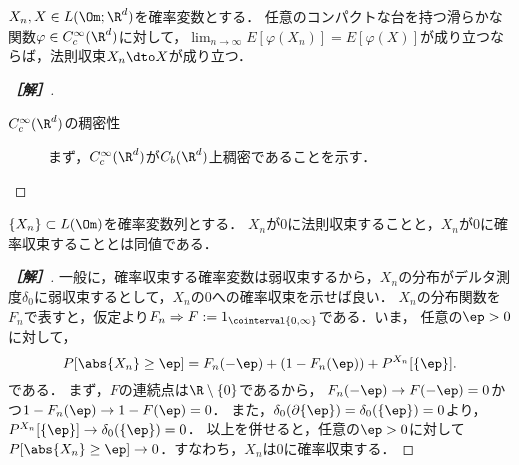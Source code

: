 \documentclass[uplatex,dvipdfmx]{jsarticle}
\begin{document}
\begin{problem*}[21]
    $X_n,X\in L(\Om;\R^d)$を確率変数とする．
    任意のコンパクトな台を持つ滑らかな関数$\varphi\in C_c^\infty(\R^d)$に対して，$\lim_{n\to\infty}E[\varphi(X_n)]=E[\varphi(X)]$が成り立つならば，法則収束$X_n\dto X$が成り立つ．
\end{problem*}
\begin{proof}[\bf［解］]\mbox{}
    \begin{description}
        \item[$C_c^\infty(\R^d)$の稠密性] まず，$C_c^\infty(\R^d)$が$C_b(\R^d)$上稠密であることを示す．
        
    \end{description}
\end{proof}

\begin{problem*}[24]
    $\{X_n\}\subset L(\Om)$を確率変数列とする．
    $X_n$が$0$に法則収束することと，$X_n$が$0$に確率収束することとは同値である．
\end{problem*}
\begin{proof}[\bf［解］]
    一般に，確率収束する確率変数は弱収束するから，$X_n$の分布がデルタ測度$\delta_0$に弱収束するとして，$X_n$の$0$への確率収束を示せば良い．
    $X_n$の分布関数を$F_n$で表すと，仮定より$F_n\Rightarrow F:=1_{\cointerval{0,\infty}}$である．いま，
    任意の$\ep>0$に対して，
    \[P[\abs{X_n}\ge\ep]=F_n(-\ep)+(1-F_n(\ep))+P^{X_n}[\{\ep\}].\]
    である．
    まず，$F$の連続点は$\R\setminus\{0\}$であるから，
    $F_n(-\ep)\to F(-\ep)=0$かつ$1-F_n(\ep)\to 1-F(\ep)=0$．
    また，$\delta_0(\partial\{\ep\})=\delta_0(\{\ep\})=0$より，$P^{X_n}[\{\ep\}]\to \delta_0(\{\ep\})=0$．
    以上を併せると，任意の$\ep>0$に対して$P[\abs{X_n}\ge\ep]\to0$．すなわち，$X_n$は$0$に確率収束する．
\end{proof}
\end{document}
